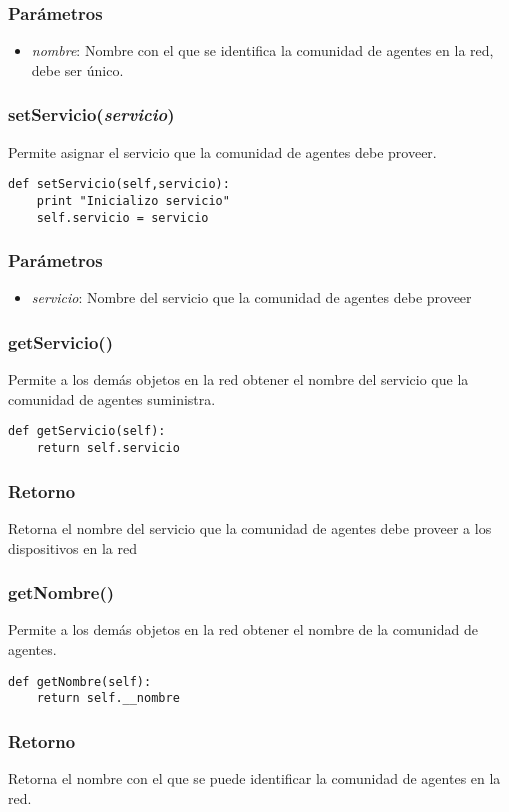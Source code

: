 \documentclass{article}
\begin{document}
\subsubsection*{Parámetros}
\begin{itemize}
\item \textit{nombre}: Nombre con el que se identifica la comunidad de agentes en la red, debe ser único.
\end{itemize}
\subsubsection{\textbf{setServicio}(\textit{servicio})}
Permite asignar el servicio que la comunidad de agentes debe proveer.
\begin{lstlisting}
def setServicio(self,servicio):
	print "Inicializo servicio"
	self.servicio = servicio
\end{lstlisting}
\subsubsection*{Parámetros}
\begin{itemize}
\item \textit{servicio}: Nombre del servicio que la comunidad de agentes debe proveer
\end{itemize}
\subsubsection{\textbf{getServicio}()}
Permite a los demás objetos en la red obtener el nombre del servicio que la comunidad de agentes suministra.
\begin{lstlisting}
def getServicio(self):
	return self.servicio
\end{lstlisting}
\subsubsection*{Retorno}
Retorna el nombre del servicio que la comunidad de agentes debe proveer a los dispositivos en la red
\subsubsection{\textbf{getNombre}()}
Permite a los demás objetos en la red obtener el nombre de la comunidad de agentes.
\begin{lstlisting}
def getNombre(self):
    return self.__nombre
\end{lstlisting}
\subsubsection*{Retorno}
Retorna el nombre con el que se puede identificar la comunidad de agentes en la red.
\end{document}
